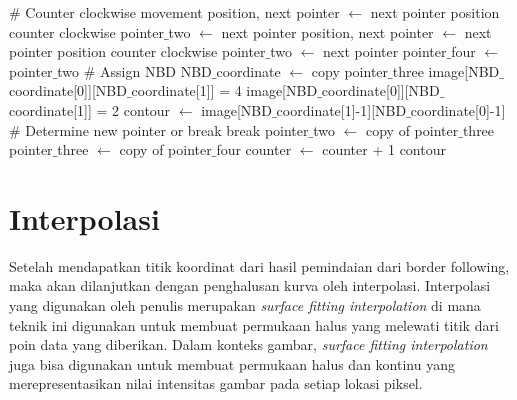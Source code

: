 \begin{algorithm}[H]
  \begin{algorithmic}[1]
      \State \# Counter clockwise movement
      \State position, next pointer $\gets$ next pointer position counter clockwise
      \State pointer$\_$two $\gets$ next pointer
        \State position, next pointer $\gets$ next pointer position counter clockwise
        \State pointer$\_$two $\gets$ next pointer
      \EndWhile
      \State pointer$\_$four $\gets$ pointer$\_$two
      \State \# Assign NBD
      \State NBD$\_$coordinate $\gets$ copy pointer$\_$three
        \State image[NBD$\_$coordinate[0]][NBD$\_$coordinate[1]] = 4
        \State image[NBD$\_$coordinate[0]][NBD$\_$coordinate[1]] = 2
      \EndIf
      \State contour $\gets$ image[NBD$\_$coordinate[1]-1][NBD$\_$coordinate[0]-1]
      \Statex
      \State \# Determine new pointer or break
          \State break
        \EndIf
      \EndIf
      \State pointer$\_$two $\gets$ copy of pointer$\_$three
      \State pointer$\_$three $\gets$ copy of pointer$\_$four
      \State counter $\gets$ counter + 1
    \EndWhile
    \State \Return contour
  \EndFunction
  \end{algorithmic}
\end{algorithm}

\section{Interpolasi}

Setelah mendapatkan titik koordinat dari hasil pemindaian 
dari border following, maka akan dilanjutkan dengan 
penghalusan kurva oleh interpolasi. Interpolasi yang 
digunakan oleh penulis merupakan 
\textit{surface fitting interpolation} di mana teknik 
ini digunakan untuk membuat permukaan halus yang melewati 
titik dari poin data yang diberikan. Dalam konteks gambar, 
\textit{surface fitting interpolation} juga bisa digunakan untuk 
membuat permukaan halus dan kontinu yang merepresentasikan 
nilai intensitas gambar pada setiap lokasi piksel.

